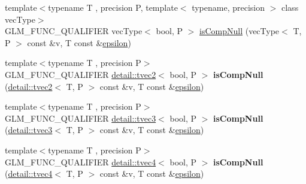 \begin{DoxyCompactItemize}
\item 
{\footnotesize template$<$typename T , precision P, template$<$ typename, precision $>$ class vec\+Type$>$ }\\G\+L\+M\+\_\+\+F\+U\+N\+C\+\_\+\+Q\+U\+A\+L\+I\+F\+I\+ER vec\+Type$<$ bool, P $>$ \hyperlink{group__gtx__vector__query_ga93ecd4137480483ce1af0de8bbbf6546}{is\+Comp\+Null} (vec\+Type$<$ T, P $>$ const \&v, T const \&\hyperlink{group__gtc__constants_gacb41049b8d22c8aa90e362b96c524feb}{epsilon})
\item 
{\footnotesize template$<$typename T , precision P$>$ }\\G\+L\+M\+\_\+\+F\+U\+N\+C\+\_\+\+Q\+U\+A\+L\+I\+F\+I\+ER \hyperlink{structglm_1_1detail_1_1tvec2}{detail\+::tvec2}$<$ bool, P $>$ {\bfseries is\+Comp\+Null} (\hyperlink{structglm_1_1detail_1_1tvec2}{detail\+::tvec2}$<$ T, P $>$ const \&v, T const \&\hyperlink{group__gtc__constants_gacb41049b8d22c8aa90e362b96c524feb}{epsilon})\hypertarget{namespaceglm_aebe68f230864fef7977c028095daed90}{}\label{namespaceglm_aebe68f230864fef7977c028095daed90}

\item 
{\footnotesize template$<$typename T , precision P$>$ }\\G\+L\+M\+\_\+\+F\+U\+N\+C\+\_\+\+Q\+U\+A\+L\+I\+F\+I\+ER \hyperlink{structglm_1_1detail_1_1tvec3}{detail\+::tvec3}$<$ bool, P $>$ {\bfseries is\+Comp\+Null} (\hyperlink{structglm_1_1detail_1_1tvec3}{detail\+::tvec3}$<$ T, P $>$ const \&v, T const \&\hyperlink{group__gtc__constants_gacb41049b8d22c8aa90e362b96c524feb}{epsilon})\hypertarget{namespaceglm_a2887bbd9268d732d99ee19e4d7c8d409}{}\label{namespaceglm_a2887bbd9268d732d99ee19e4d7c8d409}

\item 
{\footnotesize template$<$typename T , precision P$>$ }\\G\+L\+M\+\_\+\+F\+U\+N\+C\+\_\+\+Q\+U\+A\+L\+I\+F\+I\+ER \hyperlink{structglm_1_1detail_1_1tvec4}{detail\+::tvec4}$<$ bool, P $>$ {\bfseries is\+Comp\+Null} (\hyperlink{structglm_1_1detail_1_1tvec4}{detail\+::tvec4}$<$ T, P $>$ const \&v, T const \&\hyperlink{group__gtc__constants_gacb41049b8d22c8aa90e362b96c524feb}{epsilon})\hypertarget{namespaceglm_a4d5c5e644868935f8825fbe6a66ca562}{}\label{namespaceglm_a4d5c5e644868935f8825fbe6a66ca562}


\end{DoxyCompactItemize}
